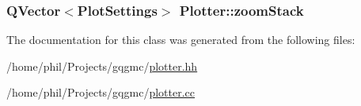 \hypertarget{class_plotter_a55ba032505163dce539c667debbcde2e}{
\subsubsection[{zoom\-Stack}]{\setlength{\rightskip}{0pt plus 5cm}\-Q\-Vector$<${\bf \-Plot\-Settings}$>$ {\bf \-Plotter\-::zoom\-Stack}}}\label{class_plotter_a55ba032505163dce539c667debbcde2e}


\-The documentation for this class was generated from the following files\-:\begin{DoxyCompactItemize}
\item 
/home/phil/\-Projects/gqgmc/\hyperlink{plotter_8hh}{plotter.\-hh}\item 
/home/phil/\-Projects/gqgmc/\hyperlink{plotter_8cc}{plotter.\-cc}\end{DoxyCompactItemize}
